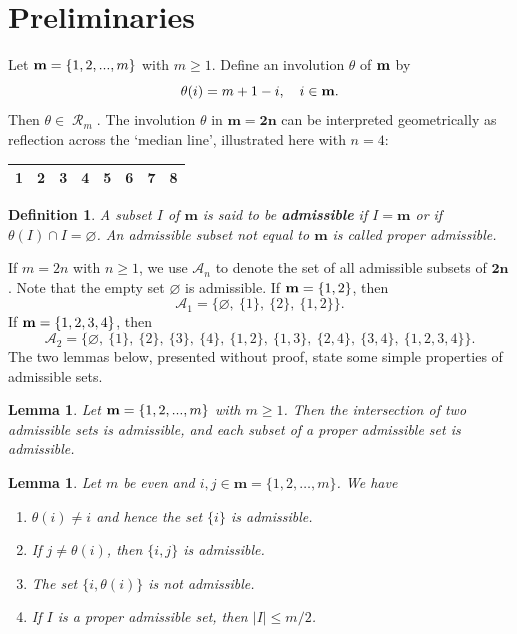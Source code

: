 \documentclass[11pt]{article}
\newtheorem{lemma}[theorem]{Lemma}
\newtheorem{defi}[theorem]{Definition}
\newcommand{\ges}{\geqslant}
\newcommand{\les}{\leqslant}
\newcommand{\mb}{\mathbf}
\DeclareMathOperator{\R}{R}
\begin{document}
\section{Preliminaries }
\vspace{-2mm}
Let ${\bf m}=\{1, 2, ..., m\}$ with $m\ges 1$. Define an involution
$\theta$ of ${\bf m}$ by 
\[
    \theta(i)= m+1-i,\quad i\in {\bf m}.
\]
Then $\theta\in\mathbf{\mathcal {\R}}_m$. 
%
The involution $\theta$ in $\mb{m=2n}$ can be
interpreted geometrically as reflection across the `median line', illustrated here with $n=4$:
 \begin{center}
 \begin{small}
\begin{tabular}{|c|c|c|c||c|c|c|c|}
\hline
1&2&3&4&5&6&7&8\\\hline
\end{tabular}
\end{small}
\end{center}
\begin{defi}{\label{admissibleDefinition}} 
A subset $I$ of $\mb m$ is said to be {\bf admissible} if $I=\mb m$ or if $\theta(I)\cap I=\varnothing$. 
An admissible subset not equal to $\mb m$ is called proper admissible.
\end{defi}
\vspace{-2mm}
If $m=2n$ with $n\ges 1$, we use $\mathscr A_n$ to denote the set of all admissible subsets of $\mb {2n}$. Note that the empty set $\varnothing$ is admissible.
%
If ${\bf m}=\{1, 2\}$, then 
$$
    \mathscr A_1 = \{\varnothing, ~\{1\}, ~\{2\},~\{1, 2\} \}.
$$ 
\vspace{-2mm}
If ${\bf m}=\{1, 2, 3, 4\}$, then 
        $$
        \mathscr A_2 =\{\varnothing, ~\{1\}, ~\{2\}, ~\{3\}, ~\{4\}, ~\{1, 2\}, ~\{1, 3\}, ~\{2, 4\}, ~\{3, 4\},~\{1, 2, 3, 4\}\}.
        $$
The two lemmas below, presented without proof, state some simple  properties of admissible sets.
\begin{lemma}{\label{lemma:intersection}}
Let ${\bf m}=\{1, 2, ..., m\}$ with $m\ges 1$. Then the intersection of two admissible sets is admissible, and each subset of a proper admissible set is admissible.
\end{lemma}
%

\begin{lemma}{\label{basicFacts}}
Let $m$ be even and $i,j\in \mb{m}=\{1,2,\dots, m\}$. We have
 \begin{enumerate}[\upshape a)]
      \vspace{-2mm}
 \item $\theta(i)\ne i$ and hence the set $\{i\}$ is admissible. 
      \vspace{-2mm}
 \item If $j\ne \theta (i)$, then $ \{i,j\}$ is admissible.
     \vspace{-2mm}
 \item The set $\{i,\theta(i)\}$ is not admissible.
      \vspace{-2mm}
 \item If $I$ is a proper admissible set, then $|I|\les m/2$.
 \end{enumerate}
\end{lemma}
 
\end{document}
